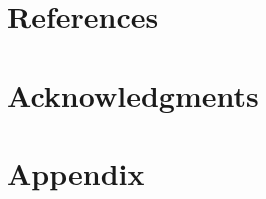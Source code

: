 \section{References}
\label{SEC:References}
\customprintbibliography


\clearpage
\section{Acknowledgments}
\label{SEC:Acknowledgments}



\clearpage


\section{Appendix}\label{SEC:Appendix}
\label{SEC:Appendix}





